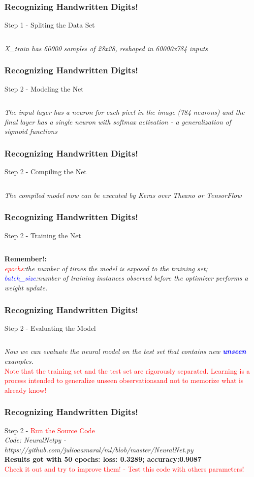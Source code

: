 \documentclass[aspectratio=169]{beamer}
\begin{document}
\begin{frame}
\frametitle{Recognizing Handwritten Digits!}
Step 1 - Spliting the Data Set
\inputminted{python}{./aux_files/fifteen.py}
\emph{X\_train has 60000 samples of 28x28, reshaped in 60000x784 inputs}
\end{frame}

\begin{frame}
\frametitle{Recognizing Handwritten Digits!}
Step 2 - Modeling the Net
\inputminted{python}{./aux_files/sixteen.py}
\emph{The input layer has a neuron for each picel in the image (784 neurons) and the final layer has a single neuron with softmax activation - a generalization of sigmoid functions}
\end{frame}

\begin{frame}
\frametitle{Recognizing Handwritten Digits!}
Step 2 - Compiling the Net
\inputminted{python}{./aux_files/seventeen.py}
\emph{The compiled model now can be executed by Keras over Theano or TensorFlow}
\end{frame}

\begin{frame}
\frametitle{Recognizing Handwritten Digits!}
Step 2 - Training the Net
\inputminted{python}{./aux_files/eighteen.py}
\textbf{Remember!:}
\\[0.5cm]
\emph{\textcolor{red}{epochs}:the number of times the model is exposed to the training set; \textcolor{blue}{batch\_size}:number of training instances observed before the optimizer performs a weight update.}
\end{frame}

\begin{frame}
\frametitle{Recognizing Handwritten Digits!}
Step 2 - Evaluating the Model 
\inputminted{python}{./aux_files/nineteen.py}
\emph{Now we can evaluate the neural model on the test set that contains new \textit{\textbf{\textcolor{blue}{unseen}}} examples. }
\\[0.2cm]
\textcolor{red}{Note that the training set and the test set are rigorously separated. Learning is a process intended to generalize unseen observationsand not to memorize what is already know!}
\end{frame}

\begin{frame}
\frametitle{Recognizing Handwritten Digits!}
Step 2 - \textcolor{red}{Run the Source Code}
\\[0.5cm]
\emph{Code: NeuralNetpy - https://github.com/julioaamaral/ml/blob/master/NeuralNet.py}
\\[0.3cm]
\textbf{Results got with 50 epochs: loss: 0.3289; accuracy:0.9087}
\\[0.3cm]
\textcolor{red}{Check it out and try to improve them! - Test this code with others parameters!}
\end{frame}
\end{document}
